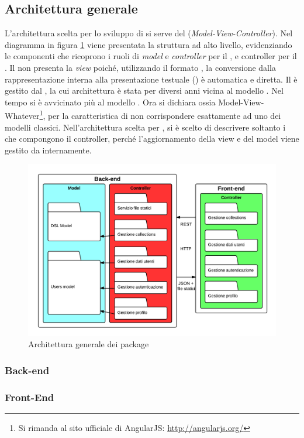 \subsection{Architettura generale}

L'architettura scelta per lo sviluppo di \ProjectName{} si serve del   (\textit{Model-View-Controller}). Nel diagramma in figura \ref{architetturaGeneralePackage} viene presentata la struttura ad alto livello, evidenziando le componenti che ricoprono i ruoli di \textit{model} e \textit{controller} per il , e controller per il . Il  non presenta la \textit{view} poiché, utilizzando il formato , la conversione dalla rappresentazione interna alla presentazione testuale () è automatica e diretta.
Il  è gestito dal  , la cui architettura è stata per diversi anni vicina al modello . Nel tempo si è avvicinato più al modello . Ora  si dichiara  ossia Model-View-Whatever\footnote{Si rimanda al sito ufficiale di AngularJS: \url{http://angularjs.org/}}, per la caratteristica di non corrispondere esattamente ad uno dei modelli classici. Nell'architettura scelta per \ProjectName{}, si è scelto di descrivere soltanto i  che compongono il controller, perché l'aggiornamento della view e del model viene gestito da  internamente.

\begin{figure}[H] %
\centering
\includegraphics[width=\textwidth]{uml/architettura-generale-package.png}
\caption{Architettura generale dei package}
\label{architetturaGeneralePackage}
\end{figure}

\subsubsection{Back-end}
\subsubsection{Front-End}